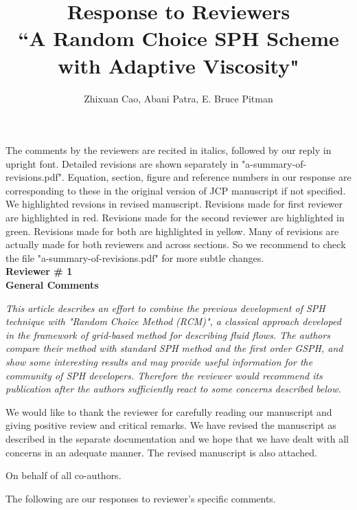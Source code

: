 \documentclass[10pt,a4paper]{article}
\begin{document}
\author{\Large {Zhixuan Cao, Abani Patra, E. Bruce Pitman}}

\title{
\LARGE \textbf{Response to Reviewers} \\
\Large \textbf{``A Random Choice SPH Scheme with Adaptive Viscosity"}}

\date{\vspace{-5ex}}

\maketitle
The comments by the reviewers are recited in italics, followed by our reply in upright font. Detailed revisions are shown separately in "a-summary-of-revisions.pdf". Equation, section, figure and reference numbers in our response are corresponding to these in the original 
version of JCP manuscript if not specified. We highlighted revsions in revised manuscript. Revisions made for first reviewer are highlighted in red. Revisions made for the second reviewer are highlighted in green. Revisions made for both are highlighted in yellow. Many of revisions are actually made for both reviewers and across sections. So we recommend to check the file "a-summary-of-revisions.pdf" for more subtle changes. \\[12pt]

\textbf{\Large Reviewer \# 1}\\[3pt]

\textbf{\large General Comments}

\textit{This article describes an effort to combine the previous development of SPH technique with "Random Choice Method (RCM)", a classical approach developed in the framework of grid-based method for
describing fluid flows. The authors compare their method with standard SPH method and the first order GSPH, and show some interesting results and may provide useful information for the community of SPH developers. Therefore the reviewer would recommend its publication after the authors sufficiently react to some concerns described below.} 

We would like to thank the reviewer for carefully reading our manuscript and giving positive review and critical remarks.
We have revised the manuscript as described in the separate documentation and we hope that we have dealt with all concerns in an adequate manner. The revised manuscript is also attached.
 
On behalf of all co-authors.

The following are our responses to reviewer's specific comments.\\[12pt]
\end{document}
